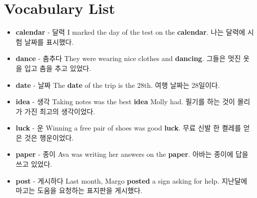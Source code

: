 \documentclass{article}
\begin{document}
\renewcommand{\familydefault}{\sfdefault}
\onehalfspacing

\section*{Vocabulary List}
\begin{addmargin}[1em]{1em}
    \begin{itemize}
        \item \fontsize{12pt}{14pt}\selectfont \textbf{calendar} - 달력 \newline
        I marked the day of the test on the \textbf{calendar}. \newline
        나는 달력에 시험 날짜를 표시했다.

        \item \fontsize{12pt}{14pt}\selectfont \textbf{dance} - 춤추다 \newline
        They were wearing nice clothes and \textbf{dancing}. \newline
        그들은 멋진 옷을 입고 춤을 추고 있었다.

        \item \fontsize{12pt}{14pt}\selectfont \textbf{date} - 날짜 \newline
        The \textbf{date} of the trip is the 28th. \newline
        여행 날짜는 28일이다.

        \item \fontsize{12pt}{14pt}\selectfont \textbf{idea} - 생각 \newline
        Taking notes was the best \textbf{idea} Molly had. \newline
        필기를 하는 것이 몰리가 가진 최고의 생각이었다.

        \item \fontsize{12pt}{14pt}\selectfont \textbf{luck} - 운 \newline
        Winning a free pair of shoes was good \textbf{luck}. \newline
        무료 신발 한 켤레를 얻은 것은 행운이었다.

        \item \fontsize{12pt}{14pt}\selectfont \textbf{paper} - 종이 \newline
        Ava was writing her answers on the \textbf{paper}. \newline
        아바는 종이에 답을 쓰고 있었다.

        \item \fontsize{12pt}{14pt}\selectfont \textbf{post} - 게시하다 \newline
        Last month, Margo \textbf{posted} a sign asking for help. \newline
        지난달에 마고는 도움을 요청하는 표지판을 게시했다.


\end{itemize}
\end{addmargin}
\end{document}
